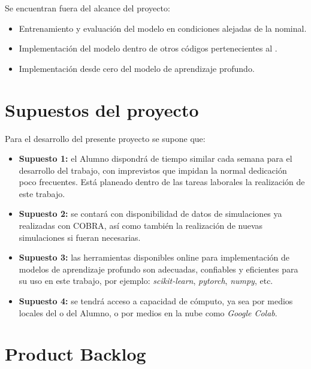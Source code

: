 \documentclass[
11pt, %
]{charter}
\begin{document}
Se encuentran fuera del alcance del proyecto:
\begin{itemize}
  \item Entrenamiento y evaluación del modelo en condiciones alejadas de la nominal.
  \item Implementación del modelo dentro de otros códigos pertenecientes al \clientename{}.
  \item Implementación desde cero del modelo de aprendizaje profundo.
\end{itemize}

\section{Supuestos del proyecto}
\label{sec:supuestos}

Para el desarrollo del presente proyecto se supone que: 
\begin{itemize}
  \item \textbf{Supuesto 1:} el Alumno dispondrá de tiempo similar cada semana para el desarrollo del trabajo, con imprevistos que impidan la normal dedicación poco frecuentes. Está planeado dentro de las tareas laborales la realización de este trabajo.
  \item \textbf{Supuesto 2:} se contará con disponibilidad de datos de simulaciones ya realizadas con COBRA, así como también la realización de nuevas simulaciones si fueran necesarias.
  \item \textbf{Supuesto 3:} las herramientas disponibles online para implementación de modelos de aprendizaje profundo son adecuadas, confiables y eficientes para su uso en este trabajo, por ejemplo: \textit{scikit-learn}, \textit{pytorch}, \textit{numpy}, etc.
  \item \textbf{Supuesto 4:} se tendrá acceso a capacidad de cómputo, ya sea por medios locales del \clientename{} o del Alumno, o por medios en la nube como \textit{Google Colab}.
\end{itemize}

\section{Product Backlog}
\label{sec:backlog}
\end{document}
